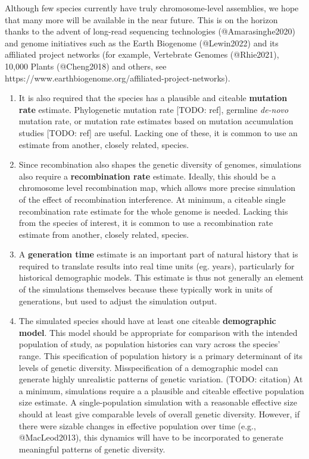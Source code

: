 \documentclass[hidelinks]{article}
\begin{document}
Although few species currently have truly chromosome-level assemblies,
we hope that many more will be available in the near future. This is on
the horizon\\
thanks to the advent of long-read sequencing technologies
(@Amarasinghe2020) and genome initiatives such as the Earth Biogenome
(@Lewin2022) and its affiliated project networks (for example,
Vertebrate Genomes (@Rhie2021), 10,000 Plants (@Cheng2018) and others,
see https://www.earthbiogenome.org/affiliated-project-networks).

\begin{enumerate}
\def\labelenumi{\arabic{enumi}.}
\setcounter{enumi}{1}
\item
  It is also required that the species has a plausible and citeable
  \textbf{mutation rate} estimate. Phylogenetic mutation rate {[}TODO:
  ref{]}, germline \emph{de-novo} mutation rate, or mutation rate
  estimates based on mutation accumulation studies {[}TODO: ref{]} are
  useful. Lacking one of these, it is common to use an estimate from
  another, closely related, species.
\item
  Since recombination also shapes the genetic diversity of genomes,
  simulations also require a \textbf{recombination rate} estimate.
  Ideally, this should be a chromosome level recombination map, which
  allows more precise simulation of the effect of recombination
  interference. At minimum, a citeable single recombination rate
  estimate for the whole genome is needed. Lacking this from the species
  of interest, it is common to use a recombination rate estimate from
  another, closely related, species.
\item
  A \textbf{generation time} estimate is an important part of natural
  history that is required to translate results into real time units
  (eg. years), particularly for historical demographic models. This
  estimate is thus not generally an element of the simulations
  themselves because these typically work in units of generations, but
  used to adjust the simulation output.
\item
  The simulated species should have at least one citeable
  \textbf{demographic model}. This model should be appropriate for
  comparison with the intended population of study, as population
  histories can vary across the species' range. This specification of
  population history is a primary determinant of its levels of genetic
  diversity. Misspecification of a demographic model can generate highly
  unrealistic patterns of genetic variation. (TODO: citation) At a
  minimum, simulations require a a plausible and citeable effective
  population size estimate. A single-population simulation with a
  reasonable effective size should at least give comparable levels of
  overall genetic diversity. However, if there were sizable changes in
  effective population over time (e.g., @MacLeod2013), this dynamics
  will have to be incorporated to generate meaningful patterns of
  genetic diversity.
\end{enumerate}
\end{document}
